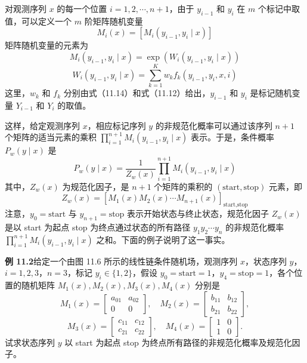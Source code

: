 \documentclass[UTF8, 12pt, fontset=fandol, oneside]{ctexart}
\begin{document}
对观测序列 $x$ 的每一个位置 $i=1,2,\cdots,n+1$，由于 $y_{i-1}$ 和 $y_i$ 在 $m$ 个标记中取值，可以定义一个 $m$ 阶矩阵随机变量
\begin{equation}
M_i(x)=[M_i(y_{i-1},y_i\mid x)]
\tag{11.21}
\end{equation}
矩阵随机变量的元素为
\begin{equation}
M_i(y_{i-1},y_i\mid x)=\exp(W_i(y_{i-1},y_i\mid x))
\tag{11.22}
\end{equation}
\begin{equation}
W_i(y_{i-1},y_i\mid x)=\sum_{k=1}^{K}w_k f_k(y_{i-1},y_i,x,i)
\tag{11.23}
\end{equation}
这里，$w_k$ 和 $f_k$ 分别由式（11.14）和式（11.12）给出，$y_{i-1}$ 和 $y_i$ 是标记随机变量 $Y_{i-1}$ 和 $Y_i$ 的取值。

这样，给定观测序列 $x$，相应标记序列 $y$ 的非规范化概率可以通过该序列 $n+1$ 个矩阵的适当元素的乘积 $\prod_{i=1}^{n+1}M_i(y_{i-1},y_i\mid x)$ 表示。于是，条件概率 $P_w(y\mid x)$ 是
\begin{equation}
P_w(y\mid x)=\frac{1}{Z_w(x)}\prod_{i=1}^{n+1}M_i(y_{i-1},y_i\mid x)
\tag{11.24}
\end{equation}
其中，$Z_w(x)$ 为规范化因子，是 $n+1$ 个矩阵的乘积的 $(\text{start},\text{stop})$ 元素，即
\begin{equation}
Z_w(x)=\left[M_1(x)M_2(x)\cdots M_{n+1}(x)\right]_{\text{start},\text{stop}}
\tag{11.25}
\end{equation}
注意，$y_0=\text{start}$ 与 $y_{n+1}=\text{stop}$ 表示开始状态与终止状态，规范化因子 $Z_w(x)$ 是以 start 为起点 stop 为终点通过状态的所有路径 $y_1y_2\cdots y_n$ 的非规范化概率 $\prod_{i=1}^{n+1}M_i(y_{i-1},y_i\mid x)$ 之和。下面的例子说明了这一事实。

\noindent\textbf{例 11.2}\quad 给定一个由图 11.6 所示的线性链条件随机场，观测序列 $x$，状态序列 $y$，$i=1,2,3$，$n=3$，标记 $y_i\in\{1,2\}$，假设 $y_0=\text{start}=1$，$y_4=\text{stop}=1$，各个位置的随机矩阵 $M_1(x),M_2(x),M_3(x),M_4(x)$ 分别是
\[
M_1(x)=
\begin{bmatrix}
a_{01} & a_{02}\\
0 & 0
\end{bmatrix},\quad
M_2(x)=
\begin{bmatrix}
b_{11} & b_{12}\\
b_{21} & b_{22}
\end{bmatrix},
\]
\[
M_3(x)=
\begin{bmatrix}
c_{11} & c_{12}\\
c_{21} & c_{22}
\end{bmatrix},\quad
M_4(x)=
\begin{bmatrix}
1 & 0\\
1 & 0
\end{bmatrix}.
\]
试求状态序列 $y$ 以 start 为起点 stop 为终点所有路径的非规范化概率及规范化因子。
\end{document}
